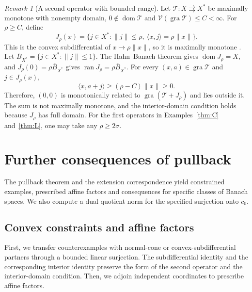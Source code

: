 \documentclass[11pt]{article}
\newcommand{\gra}{\operatorname{gra}}
\newcommand{\dom}{\operatorname{dom}}
\newcommand{\pair}[2]{\langle #1,#2\rangle}
\theoremstyle{definition}
\theoremstyle{remark}
\newtheorem{remark}{Remark}
\begin{document}
\begin{remark}[A second operator with bounded range]
\label{rem:bounded-range-partner}
Let $\mathcal T:X\rightrightarrows X^*$ be maximally monotone with nonempty domain, $0\notin\dom\mathcal T$ and $\mathcal V(\gra\mathcal T)\le C<\infty$. For $\rho\ge C$, define
\[
J_\rho(x)=
\{j\in X^*:\|j\|\le\rho,\ \pair{x}{j}=\rho\|x\|\}.
\]
This is the convex subdifferential of $x\mapsto\rho\|x\|$, so it is maximally monotone \cite{rockafellar1970subdiff}. Let $\overline B_{X^*}=\{j\in X^*:\|j\|\le1\}$. The Hahn--Banach theorem gives $\dom J_\rho=X$, and $J_\rho(0)=\rho\overline B_{X^*}$ gives $\operatorname{ran}J_\rho=\rho\overline B_{X^*}$. For every $(x,a)\in\gra\mathcal T$ and $j\in J_\rho(x)$,
\[
\pair{x}{a+j}\ge(\rho-C)\|x\|\ge0.
\]
Therefore, $(0,0)$ is monotonically related to $\gra(\mathcal T+J_\rho)$ and lies outside it. The sum is not maximally monotone, and the interior-domain condition holds because $J_\rho$ has full domain. For the first operators in Examples~\ref{thm:C} and~\ref{thm:L}, one may take any $\rho\ge2\sigma$.
\end{remark}

\section{Further consequences of pullback}
\label{app:pullback}

The pullback theorem and the extension correspondence yield constrained examples, prescribed affine factors and consequences for specific classes of Banach spaces. We also compute a dual quotient norm for the specified surjection onto $c_0$.

\subsection{Convex constraints and affine factors}
\label{subsec:appendix-affine-transfer}

First, we transfer counterexamples with normal-cone or convex-subdifferential partners through a bounded linear surjection. The subdifferential identity and the corresponding interior identity preserve the form of the second operator and the interior-domain condition. Then, we adjoin independent coordinates to prescribe affine factors.
\end{document}
